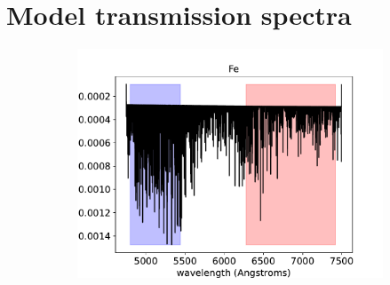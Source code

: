 \documentclass[twocolumn]{aastex631}
\begin{document}
        \section{Model transmission spectra}
            \begin{figure}[ht!]
                \centering
                \begin{subfigure}[b]{0.3\textwidth}\label{fig:Fe-spectrum}
                    \centering
                    \includegraphics[width=\textwidth]{plots/spectra/spectrum.KELT-20b.Fe.5.39e-05.inverted-transmission-better}
                    

\end{subfigure}
\end{figure}
\end{document}
